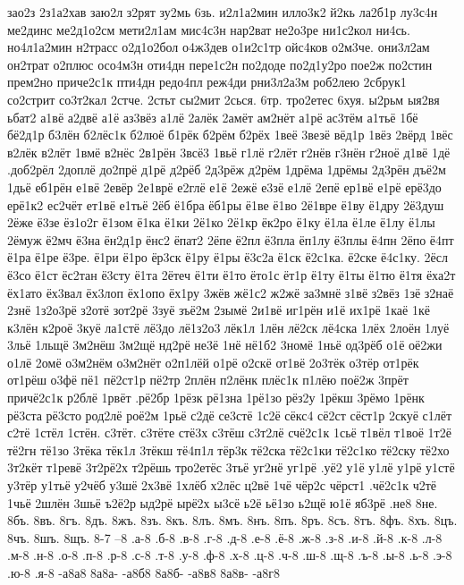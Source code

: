 {зао2з
2з1а2хав
заю2л
з2рят
зу2мь
6зь.
и2л1а2мин
илло3к2
й2кь
ла2б1р
лу3с4н
ме2динс
ме2д1о2см
мети2л1ам
мис4с3н
нар2ват
не2о3ре
ни1с2кол
ни4сь.
но4л1а2мин
н2трасс
о2д1о2бол
о4ж3дев
о1и2с1тр
ойс4ков
о2м3че.
они3л2ам
он2трат
о2плюс
осо4м3н
оти4дн
пере1с2н
по2доде
по2д1у2ро
пое2ж
по2стин
прем2но
приче2с1к
пти4дн
редо4пл
реж4ди
рни3л2а3м
роб2лею
2сбрук1
со2стрит
со3т2кал
2стче.
2стьт
сы2мит
2сься.
6тр.
тро2етес
6хуя.
ы2рьм
ыя2вя
ьбат2
а1вё
а2двё
а1ё
аз3вёз
а1лё
2алёк
2амёт
ам2нёт
а1рё
ас3тём
а1тьё
1бё
бё2д1р
б3лён
б2лёс1к
б2люё
б1рёк
б2рём
б2рёх
1веё
3везё
вёд1р
1вёз
2вёрд
1вёс
в2лёк
в2лёт
1вмё
в2нёс
2в1рён
3всё3
1вьё
г1лё
г2лёт
г2нёв
г3нён
г2ноё
д1вё
1дё
.доб2рёл
2доплё
до2прё
д1рё
д2рёб
2д3рёж
д2рём
1дрёма
1дрёмы
2д3рён
дъё2м
1дьё
еб1рён
е1вё
2евёр
2е1врё
е2глё
е1ё
2ежё
е3зё
е1лё
2епё
ер1вё
е1рё
ерё3до
ерё1к2
ес2чёт
ет1вё
е1тьё
2ёб
ё1бра
ёб1ры
ё1ве
ё1во
2ё1вре
ё1ву
ё1дру
2ё3душ
2ёже
ё3зе
ёз1о2г
ё1зом
ё1ка
ё1ки
2ё1ко
2ё1кр
ёк2ро
ё1ку
ё1ла
ё1ле
ё1лу
ё1лы
2ёмуж
ё2мч
ё3на
ён2д1р
ёнс2
ёпат2
2ёпе
ё2пл
ё3пла
ёп1лу
ё3плы
ё4пн
2ёпо
ё4пт
ё1ра
ё1ре
ё3ре.
ё1ри
ё1ро
ёр3ск
ё1ру
ё1ры
ё3с2а
ё1ск
ё2с1ка.
ё2ске
ё4с1ку.
2ёсл
ё3со
ё1ст
ёс2тан
ё3сту
ё1та
2ётеч
ё1ти
ё1то
ёто1с
ёт1р
ё1ту
ё1ты
ё1тю
ё1тя
ёха2т
ёх1ато
ёх3вал
ёх3лоп
ёх1опо
ёх1ру
3жёв
жё1с2
ж2жё
за3мнё
з1вё
з2вёз
1зё
з2наё
2знё
1з2о3рё
з2отё
зот2рё
3зуё
зъё2м
2зымё
2и1вё
иг1рён
и1ё
их1рё
1каё
1кё
к3лён
к2роё
3куё
ла1стё
лё3до
лё1з2о3
лёк1л
1лён
лё2ск
лё4ска
1лёх
2лоён
1луё
3льё
1льщё
3м2нёш
3м2щё
нд2рё
не3ё
1нё
нё1б2
3номё
1ньё
од3рёб
о1ё
оё2жи
о1лё
2омё
о3м2нём
о3м2нёт
о2п1лёй
о1рё
о2скё
от1вё
2о3тёк
о3тёр
от1рёк
от1рёш
о3фё
пё1
пё2ст1р
пё2тр
2плён
п2лёнк
плёс1к
п1лёю
поё2ж
3прёт
причё2с1к
р2блё
1рвёт
.рё2бр
1рёзк
рё1зна
1рё1зо
рёз2у
1рёкш
3рёмо
1рёнк
рё3ста
рё3сто
род2лё
роё2м
1рьё
с2дё
се3стё
1с2ё
сёкс4
сё2ст
сёст1р
2скуё
с1лёт
с2тё
1стёл
1стён.
с3тёт.
с3тёте
стё3х
с3тёш
с3т2лё
счё2с1к
1сьё
т1вёл
т1воё
1т2ё
тё2гн
тё1зо
3тёка
тёк1л
3тёкш
тё4п1л
тёр3к
тё2ска
тё2с1ки
тё2с1ко
тё2ску
тё2хо
3т2кёт
т1ревё
3т2рё2х
т2рёшь
тро2етёс
3тьё
уг2нё
уг1рё
.уё2
у1ё
у1лё
у1рё
у1стё
у3тёр
у1тьё
у2чёб
у3шё
2х3вё
1хлёб
х2лёс
ц2вё
1чё
чёр2с
чёрст1
.чё2с1к
ч2тё
1чьё
2шлён
3шьё
ъ2ё2р
ыд2рё
ырё2х
ы3сё
ь2ё
ьё1зо
ь2щё
ю1ё
яб3рё
.не8
8не.
8бъ.
8въ.
8гъ.
8дъ.
8жъ.
8зъ.
8къ.
8лъ.
8мъ.
8нъ.
8пъ.
8ръ.
8съ.
8тъ.
8фъ.
8хъ.
8цъ.
8чъ.
8шъ.
8щъ.
8-7
--8
.а-8
.б-8
.в-8
.г-8
.д-8
.е-8
.ё-8
.ж-8
.з-8
.и-8
.й-8
.к-8
.л-8
.м-8
.н-8
.о-8
.п-8
.р-8
.с-8
.т-8
.у-8
.ф-8
.х-8
.ц-8
.ч-8
.ш-8
.щ-8
.ъ-8
.ы-8
.ь-8
.э-8
.ю-8
.я-8
-а8а8
8а8а-
-а8б8
8а8б-
-а8в8
8а8в-
-а8г8
}
